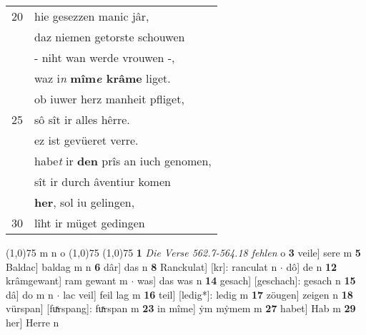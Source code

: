 \documentclass[8pt,a4paper,notitlepage]{article}
\begin{document}
\begin{table}[ht]
\begin{minipage}[t]{0.5\linewidth}
\begin{tabular}{rl}
20 & hie gesezzen manic jâr,\\ 
 & daz niemen getorste schouwen\\ 
 & - niht wan werde vrouwen -,\\ 
 & waz i\textit{n} \textbf{mîm\textit{e} krâme} liget.\\ 
 & ob iuwer herz manheit pfliget,\\ 
25 & sô sît ir alles hêrre.\\ 
 & ez ist gevüeret verre.\\ 
 & habe\textit{t} ir \textbf{den} prîs an iuch genomen,\\ 
 & sît ir durch âventiur komen\\ 
 & \textbf{her}, sol iu gelingen,\\ 
30 & lîht ir müget gedingen\\ 
\end{tabular}
\scriptsize
\line(1,0){75} \newline
m n o \newline
\line(1,0){75} \newline
\newline
\line(1,0){75} \newline
\textbf{1} \textit{Die Verse 562.7-564.18 fehlen} o  \textbf{3} veile] sere m \textbf{5} Baldac] baldag m n \textbf{6} dâr] das n \textbf{8} Ranckulat] [kr]: ranculat n  $\cdot$ dô] de n \textbf{12} krâmgewant] ram gewant m  $\cdot$ was] das was n \textbf{14} gesach] [geschach]: gesach n \textbf{15} dâ] do m n  $\cdot$ lac veil] feil lag m \textbf{16} teil] [ledig*]: ledig m \textbf{17} zöugen] zeigen n \textbf{18} vürspan] [fuͯrspang]: fuͯrspan m \textbf{23} in mîme] ẏm mẏmem m \textbf{27} habet] Hab m \textbf{29} her] Herre n \newline
\end{minipage}
\end{table}
\newpage
\end{document}
